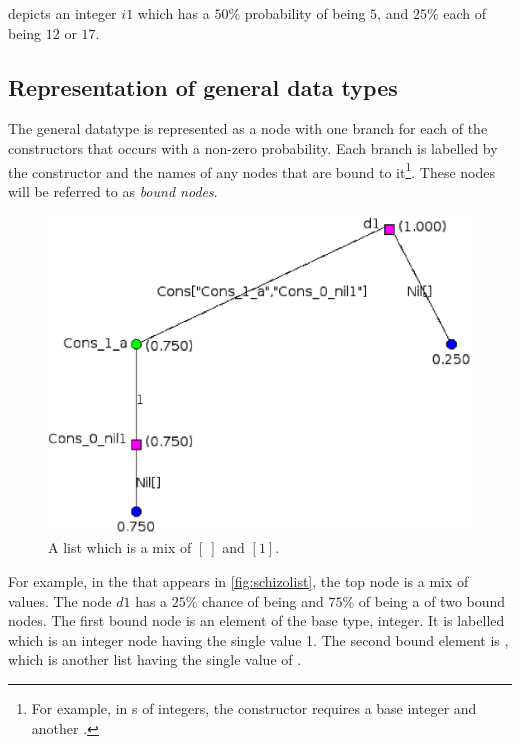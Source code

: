  depicts an
integer $i1$ which has 
a $50\%$ probability of being $5$, and $25\%$ each of being $12$ or $17$.

\subsection{Representation of general data types}\label{subsec:representgeneraldatatyps}
The general datatype is represented 
as a node with one branch for each of the constructors that occurs
with a non-zero probability. Each branch is labelled by the 
constructor and the names of any nodes that are 
bound to it\footnote{For example, in s of 
integers, the
 constructor requires a base integer and another .}.
These
nodes will be referred to as  \emph{bound nodes}.


\begin{figure}[htbp]
\centerline{
\includegraphics[scale=.5]{images/listExample.eps}
}
\caption{A list which is a mix of $[\ ]$ and $[1]$.}\label{fig:schizolist}
\end{figure}



For example, in the  that appears in \vref{fig:schizolist}, 
the top node  is a mix of values. The node $d1$ has a $25\%$ chance of 
being  and $75\%$ of being a  of two bound nodes.
The first bound node is an element of the base type, integer. 
It is labelled  which
is an integer node having the single value 1. The second bound element is 
,  which is another list having the
 single value of . 




